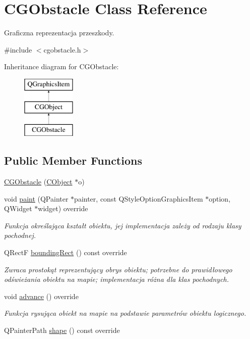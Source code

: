 \hypertarget{class_c_g_obstacle}{}\section{C\+G\+Obstacle Class Reference}
\label{class_c_g_obstacle}


Graficzna reprezentacja przeszkody.  




{\ttfamily \#include $<$cgobstacle.\+h$>$}

Inheritance diagram for C\+G\+Obstacle\+:\begin{figure}[H]
\begin{center}
\leavevmode
\includegraphics[height=3.000000cm]{class_c_g_obstacle}
\end{center}
\end{figure}
\subsection*{Public Member Functions}
\begin{DoxyCompactItemize}
\item 
\mbox{\hyperlink{class_c_g_obstacle_af085e19a335a0e9c232f3b6766af79cd}{C\+G\+Obstacle}} (\mbox{\hyperlink{class_c_object}{C\+Object}} $\ast$o)
\item 
void \mbox{\hyperlink{class_c_g_obstacle_a4ae41138f5fa9f7929c71f1999df7793}{paint}} (Q\+Painter $\ast$painter, const Q\+Style\+Option\+Graphics\+Item $\ast$option, Q\+Widget $\ast$widget) override
\begin{DoxyCompactList}\small\item\em Funkcja określająca kształt obiektu, jej implementacja zależy od rodzaju klasy pochodnej. \end{DoxyCompactList}\item 
Q\+RectF \mbox{\hyperlink{class_c_g_obstacle_a88a124737ae6f96c6b07316591ecdb34}{bounding\+Rect}} () const override
\begin{DoxyCompactList}\small\item\em Zwraca prostokąt reprezentujący obrys obiektu; potrzebne do prawidłowego odświeżania obiektu na mapie; implementacja różna dla klas pochodnych. \end{DoxyCompactList}\item 
void \mbox{\hyperlink{class_c_g_obstacle_adeb38e94e73f2c3d5d84afbb5e5e0fe7}{advance}} () override
\begin{DoxyCompactList}\small\item\em Funkcja rysująca obiekt na mapie na podstawie parametrów obiektu logicznego. \end{DoxyCompactList}\item 
Q\+Painter\+Path \mbox{\hyperlink{class_c_g_obstacle_a850f592630a96855bc6fb7b8e4eece40}{shape}} () const override
\end{DoxyCompactItemize}
